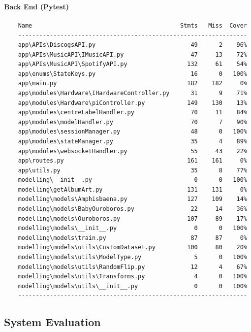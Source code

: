 \begin{uomappendix}
                \paragraph{Back End (Pytest)}
                \begin{verbatim}
    Name                                          Stmts   Miss  Cover
    -----------------------------------------------------------------
    app\APIs\DiscogsAPI.py                           49      2    96%
    app\APIs\MusicAPI\IMusicAPI.py                   47     13    72%
    app\APIs\MusicAPI\SpotifyAPI.py                 132     61    54%
    app\enums\StateKeys.py                           16      0   100%
    app\main.py                                     182    182     0%
    app\modules\Hardware\IHardwareController.py      31      9    71%
    app\modules\Hardware\piController.py            149    130    13% 
    app\modules\centreLabelHandler.py                70     11    84% 
    app\modules\modelHandler.py                      70      7    90%
    app\modules\sessionManager.py                    48      0   100%
    app\modules\stateManager.py                      35      4    89%
    app\modules\websocketHandler.py                  55     43    22%
    app\routes.py                                   161    161     0%
    app\utils.py                                     35      8    77%
    modelling\__init__.py                             0      0   100%
    modelling\getAlbumArt.py                        131    131     0%
    modelling\models\Amphisbaena.py                 127    109    14%
    modelling\models\BabyOuroboros.py                22     14    36%
    modelling\models\Ouroboros.py                   107     89    17%
    modelling\models\__init__.py                      0      0   100%
    modelling\models\train.py                        87     87     0%
    modelling\models\utils\CustomDataset.py         100     80    20%
    modelling\models\utils\ModelType.py               5      0   100%
    modelling\models\utils\RandomFlip.py             12      4    67%
    modelling\models\utils\Transforms.py              4      0   100%
    modelling\models\utils\__init__.py                0      0   100%
    -----------------------------------------------------------------
                \end{verbatim}
    
            \subsection{System Evaluation}

\end{uomappendix}
